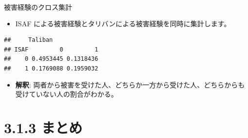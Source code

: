 \documentclass[
  ignorenonframetext,
]{beamer}
\newenvironment{Shaded}{\begin{snugshade}}{\end{snugshade}}
\newcommand{\AttributeTok}[1]{\textcolor[rgb]{0.77,0.63,0.00}{#1}}
\newcommand{\CommentTok}[1]{\textcolor[rgb]{0.56,0.35,0.01}{\textit{#1}}}
\newcommand{\FunctionTok}[1]{\textcolor[rgb]{0.00,0.00,0.00}{#1}}
\newcommand{\NormalTok}[1]{#1}
\newcommand{\OtherTok}[1]{\textcolor[rgb]{0.56,0.35,0.01}{#1}}
\newcommand{\SpecialCharTok}[1]{\textcolor[rgb]{0.00,0.00,0.00}{#1}}
\providecommand{\tightlist}{%
  \setlength{\itemsep}{0pt}\setlength{\parskip}{0pt}}
\begin{document}
\begin{frame}[fragile]{被害経験のクロス集計}
\protect\hypertarget{ux88abux5bb3ux7d4cux9a13ux306eux30afux30edux30b9ux96c6ux8a08}{}
\begin{itemize}
\tightlist
\item
  ISAF による被害経験とタリバンによる被害経験を同時に集計します。
\end{itemize}

\scriptsize

\begin{Shaded}
\end{Shaded}

\begin{verbatim}
##     Taliban
## ISAF         0         1
##    0 0.4953445 0.1318436
##    1 0.1769088 0.1959032
\end{verbatim}

\normalsize

\begin{itemize}
\tightlist
\item
  \textbf{解釈}:
  両者から被害を受けた人、どちらか一方から受けた人、どちらからも受けていない人の割合がわかる。
\end{itemize}
\end{frame}

\hypertarget{ux307eux3068ux3081}{%
\section{3.1.3 まとめ}\label{ux307eux3068ux3081}}
\end{document}

